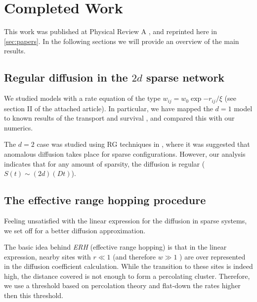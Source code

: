 \chapter{Completed Work}


This work was published at Physical Review A \cite{de_leeuw_diffusion_2012},
and reprinted here in \autoref{sec:papers}. In the
following sections we will provide an overview
of the main results.






\section{Regular diffusion in the $2d$ sparse network}

We studied models with a rate equation of the type $w_{ij}=w_0 \exp{-r_{ij}/\xi}$ 
(see section II of the attached article). In particular, we have mapped the
$d=1$ model to known results of the transport and survival \cite{alexander_excitation_1981},
and compared this with our numerics. 


The $d=2$ case was studied using RG techniques in \cite{amir_mean-field_2008,*amir_localization_2010}, 
where it was suggested that anomalous diffusion takes place for sparse configurations.
However, our analysis indicates that for any amount of sparsity,
the diffusion is regular ($S(t)\sim (2d)(Dt)$).

\section{The effective range hopping procedure}


Feeling unsatisfied with the linear expression for the diffusion
in sparse systems,
we set off for a better diffusion approximation.

The basic idea behind \emph{ERH} (effective range hopping) is that in the linear
expression, nearby sites 
with $r\ll 1$ (and therefore $w \gg 1$ ) are over represented in
the diffusion coefficient calculation. While the transition to
these sites is indeed high, the distance covered is not enough
to form a percolating cluster. Therefore, we use a threshold based
on percolation theory and flat-down the rates higher then this threshold.


